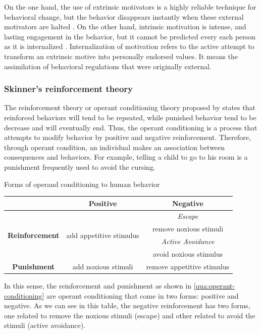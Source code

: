 On the one hand, the use of extrinsic motivators is a highly reliable technique for behavioral change, but the behavior disappears instantly when these external motivators are halted \cite{HaggerChatzisarantis2007}. On the other hand, intrinsic motivation is intense, and lasting engagement in the behavior, but it cannot be predicted every each person as it is internalized \cite{DeciRyan2010}. Internalization of motivation refers to the active attempt to transform an extrinsic motive into personally endorsed values. It means the assimilation of behavioral regulations that were originally external.

\subsubsection{Skinner's reinforcement theory}
\label{subsubsec:operant-conditioning}

The reinforcement theory or operant conditioning theory proposed by  states that reinforced behaviors will tend to be repeated, while punished behavior tend to be decrease and will eventually end. Thus, the operant conditioning is a process that attempts to modify behavior by positive and negative reinforcement. Therefore, through operant condition, an individual makes an association between consequences and behaviors. For example, telling a child to go to his room is a punishment frequently used to avoid the cursing.

\begin{quadro}[htb]
\caption{Forms of operand conditioning to human behavior}
\label{qua:operant-conditioning}
\centering
\scriptsize
\begin{tabular}{|c|c|c|} \hline
 & \textbf{Positive} & \textbf{Negative} \\ \hline
\multirow{4}{*}{\textbf{Reinforcement}} & \multirow{4}{*}{add appetitive stimulus} & \emph{Escape} \\
 & & remove noxious stimuli \\ \cline{3-3}
 & & \emph{Active Avoidance} \\
 & & avoid noxious stimulus \\ \hline
\textbf{Punishment} & add noxious stimuli & remove appetitive stimulus \\ \hline
\end{tabular}
 \fautor
\end{quadro}

In this sense, the reinforcement and punishment as shown in  \autoref{qua:operant-conditioning} are operant conditioning that come in two forms: positive and negative. As we can see in this table, the negative reinforcement has two forms, one related to remove the noxious stimuli (escape) and other related to avoid the stimuli (active avoidance).

